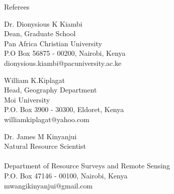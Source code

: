 \documentclass{resume} %
\begin{document}


\begin{rSection}{Referees}
\begin{esSubsection}
{Dr. Dionysious K Kiambi}\\
{Dean, Graduate School}\\
{Pan Africa Christian University}\\
{P.O Box 56875 - 00200, Nairobi, Kenya}\\
{dionysious.kiambi@pacuniversity.ac.ke}
\end{esSubsection}

\begin{esSubsection}
{William  K.Kiplagat}\\
{Head, Geography Department}\\
{Moi University}\\
{P.O. Box 3900 - 30300, Eldoret, Kenya}\\
{williamkiplagat@yahoo.com}
\end{esSubsection}

\begin{esSubsection}
{Dr. James M Kinyanjui}\\
{Natural Resource Scientist}\\
{}\\
{Department of Resource Surveys and Remote Sensing}\\
{P.O. Box 47146 - 00100, Nairobi, Kenya}\\
{mwangikinyanjui@gmail.com}
\end{esSubsection}

\end{rSection}
\end{document}
